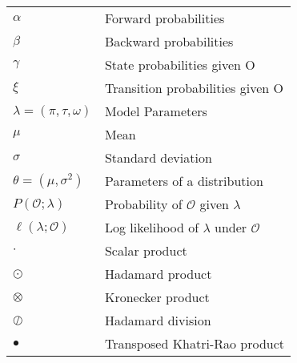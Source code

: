 \begin{table}[htb!]
\begin{tabular}{ll}
        $\alpha$                        & Forward probabilities                           \\
        $\beta$                         & Backward probabilities                          \\
        $\gamma$                        & State probabilities given O                     \\
        $\xi$                           & Transition probabilities given O                \\
        $\lambda = (\pi, \tau, \omega)$ & Model Parameters                                \\
        $\mu$                           & Mean                                            \\
        $\sigma$                        & Standard deviation                              \\
        $\theta = (\mu, \sigma^2)$      & Parameters of a distribution                    \\
        $P(\mathcal{O}; \lambda)$       & Probability of $\mathcal{O}$ given $\lambda$    \\
        $\ell(\lambda ;\mathcal{O})$    & Log likelihood of $\lambda$ under $\mathcal{O}$ \\
        $\cdot$                         & Scalar product                                  \\
        $\odot$                         & Hadamard product                                \\
        $\otimes$                       & Kronecker product                               \\
        $\oslash$                       & Hadamard division                               \\
        $\bullet$                       & Transposed Khatri-Rao product                   \\
        \bottomrule
    \end{tabular}
    \label{tab:symbol-table}
\end{table}
